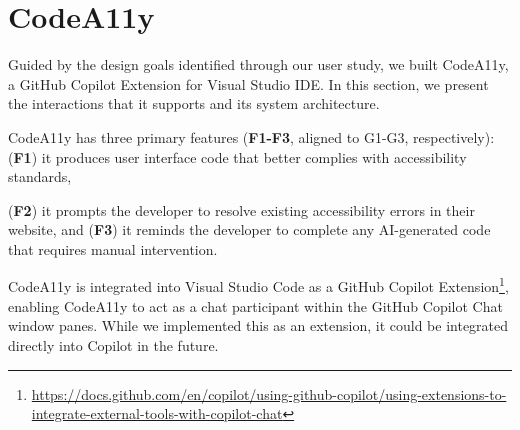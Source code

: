 \section{CodeA11y}
\label{system}
Guided by the design goals identified through our user study, we built CodeA11y, a GitHub Copilot Extension for Visual Studio IDE. In this section, we present the interactions that it supports and its system architecture.

    
CodeA11y has three primary features (\textbf{F1-F3}, aligned to G1-G3, respectively): (\textbf{F1}) it produces user interface code that better complies with accessibility standards, \begin{highlight}
(\textbf{F2}) it prompts the developer to resolve existing accessibility errors in their website, and (\textbf{F3}) it reminds the developer to complete any AI-generated code that requires manual intervention.
\end{highlight} CodeA11y is integrated into Visual Studio Code as a GitHub Copilot Extension\footnote{\url{https://docs.github.com/en/copilot/using-github-copilot/using-extensions-to-integrate-external-tools-with-copilot-chat}}, enabling CodeA11y to act as a chat participant within the GitHub Copilot Chat window panes. While we implemented this as an extension, it could be integrated directly into Copilot in the future.


